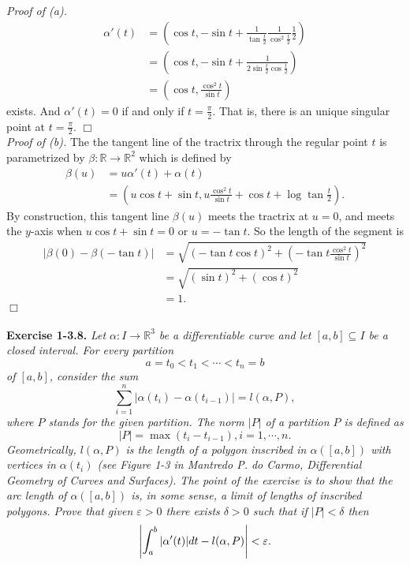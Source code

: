 \documentclass{article}
\begin{document}
\emph{Proof of (a).}
\begin{align*}
\alpha'(t)
&= \left(
\cos t,
-\sin t + \frac{1}{\tan\frac{t}{2}} \frac{1}{\cos^{2}\frac{t}{2}} \frac{1}{2}
\right) \\
&= \left(
\cos t,
-\sin t + \frac{1}{2 \sin\frac{t}{2} \cos\frac{t}{2}}
\right) \\
&= \left(
\cos t,
\frac{\cos^2 t}{\sin t}
\right)
\end{align*}
exists.
And $\alpha'(t) = 0$ if and only if $t = \frac{\pi}{2}$.
That is, there is an unique singular point at $t = \frac{\pi}{2}$.
$\Box$ \\

\emph{Proof of (b).}
The the tangent line of the tractrix through the regular point $t$
is parametrized by $\beta: \mathbb{R} \to \mathbb{R}^2$ which is defined by
\begin{align*}
\beta(u)
&= u\alpha'(t) + \alpha(t) \\
&= \left( u \cos t + \sin t, u \frac{\cos^2 t}{\sin t} + \cos t + \log\tan\frac{t}{2} \right).
\end{align*}
By construction, this tangent line $\beta(u)$ meets the tractrix at $u = 0$,
and meets the $y$-axis when $u \cos t + \sin t = 0$ or $u = -\tan t$.
So the length of the segment is
\begin{align*}
|\beta(0) - \beta(-\tan t)|
&= \sqrt{(-\tan t \cos t)^2+ \left( -\tan t \frac{\cos^2 t}{\sin t} \right)^2} \\
&= \sqrt{(\sin t)^2+ (\cos t)^2} \\
&= 1.
\end{align*}
$\Box$ \\\\






\textbf{Exercise 1-3.8.}
\emph{Let $\alpha: I \to \mathbb{R}^3$ be a differentiable curve and
let $[a,b] \subseteq I$ be a closed interval.
For every partition
\[
  a = t_0 < t_1 < \cdots < t_n = b
\]
of $[a,b]$, consider the sum
\[
  \sum_{i=1}^{n} |\alpha(t_i) - \alpha(t_{i-1})| = l(\alpha,P),
\]
where $P$ stands for the given partition.
The norm $|P|$ of a partition $P$ is defined as
\[
  |P| = \max(t_i - t_{i-1}), i = 1, \cdots, n.
\]
Geometrically, $l(\alpha,P)$ is the length of a polygon inscribed in $\alpha([a,b])$
with vertices in $\alpha(t_i)$
(see Figure 1-3 in Mantredo P. do Carmo, Differential Geometry of Curves and Surfaces).
The point of the exercise is to show that the arc length of $\alpha([a,b])$ is,
in some sense, a limit of lengths of inscribed polygons.
Prove that given $\varepsilon > 0$ there exists $\delta > 0$ such that
if $|P| < \delta$ then
\[
  \abs{ \int_{a}^{b} |\alpha'(t)|dt - l(\alpha,P) } < \varepsilon.
\]} \\
\end{document}
